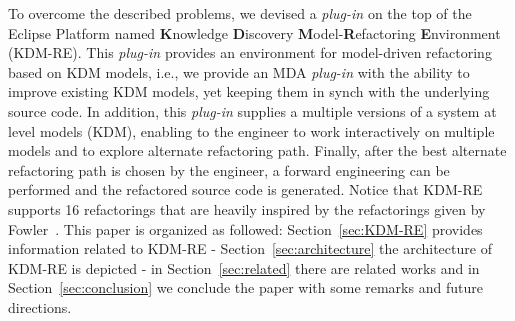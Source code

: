 To overcome the described problems, we devised a \textit{plug-in} on the top of the Eclipse Platform named  \textbf{K}nowledge \textbf{D}iscovery \textbf{M}odel-\textbf{R}efactoring \textbf{E}nvironment (KDM-RE). 
This \textit{plug-in} provides an environment for model-driven refactoring based on KDM models, i.e., we provide an MDA \textit{plug-in} with the ability to improve existing KDM models, yet keeping them in synch with the underlying source code. 
In addition, this \textit{plug-in} supplies a multiple versions of a system at level models (KDM), enabling to the engineer  to work interactively on multiple models and to explore alternate refactoring path. Finally, after the best alternate refactoring path is chosen by the engineer, a forward engineering can be performed and the refactored source code is generated. Notice that KDM-RE supports 16 refactorings that are heavily inspired by the refactorings given by Fowler~\cite{refactImpro}. This paper is organized as followed: Section~\ref{sec:KDM-RE} provides information related to KDM-RE - Section~\ref{sec:architecture} the architecture of KDM-RE is depicted - in Section~\ref{sec:related} there are related works and in Section~\ref{sec:conclusion} we conclude the paper with some remarks and future directions.







